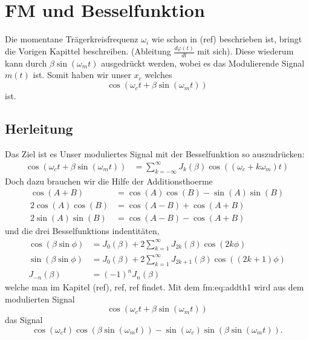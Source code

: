 %
%
%
\section{FM und Besselfunktion 
\label{fm:section:proof}}
Die momentane Trägerkreisfrequenz \(\omega_i\) wie schon in (ref) beschrieben ist, bringt die Vorigen Kapittel beschreiben. (Ableitung \(\frac{d \varphi(t)}{dt}\) mit sich).
Diese wiederum kann durch \(\beta\sin(\omega_mt)\) ausgedrückt werden, wobei es das Modulierende Signal \(m(t)\) ist.
Somit haben wir unser \(x_c\) welches 
\[
\cos(\omega_c t+\beta\sin(\omega_mt))
\]
ist.
\subsection{Herleitung}
Das Ziel ist es Unser moduliertes Signal mit der Besselfunktion so auszudrücken:
\begin{align}
    \cos(\omega_ct+\beta\sin(\omega_mt))
    &=
    \sum_{k= -\infty}^\infty J_{k}(\beta) \cos((\omega_c+k\omega_m)t)
    \label{fm:eq:proof}
\end{align}
Doch dazu brauchen wir die Hilfe der Additionsthoerme 
\begin{align}
    \cos(A + B) 
    &= 
    \cos(A)\cos(B)-\sin(A)\sin(B)
    \label{fm:eq:addth1}
    \\
    2\cos (A)\cos (B)
    &=
    \cos(A-B)+\cos(A+B)
    \label{fm:eq:addth2}
    \\
    2\sin(A)\sin(B)
    &=
    \cos(A-B)-\cos(A+B)
    \label{fm:eq:addth3}
\end{align}
und die drei Besselfunktions indentitäten,
\begin{align}
    \cos(\beta\sin\phi)
    &=
    J_0(\beta) + 2\sum_{k=1}^\infty J_{2k}(\beta) \cos(2k\phi)
    \label{fm:eq:besselid1}
    \\
    \sin(\beta\sin\phi)
    &=
    J_0(\beta) + 2\sum_{k=1}^\infty J_{2k+1}(\beta) \cos((2k+1)\phi)
    \label{fm:eq:besselid2}
    \\
    J_{-n}(\beta) &= (-1)^n J_n(\beta)
    \label{fm:eq:besselid3}
\end{align}
welche man im Kapitel (ref), ref, ref findet.
\newline
Mit dem \refname{fm:eq:addth1} wird aus dem modulierten Signal
\[
\cos(\omega_c t + \beta\sin(\omega_mt))
\]
das Signal
\[
    \cos(\omega_c t)\cos(\beta\sin(\omega_m t))-\sin(\omega_c)\sin(\beta\sin(\omega_m t)).
    \label{fm:eq:start}
\]
